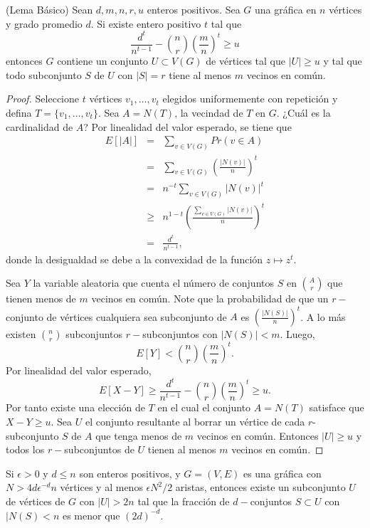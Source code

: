 \begin{theorem}(Lema Básico)\label{drc}
  Sean $d, m, n, r, u$ enteros positivos. Sea $G$ una gráfica en
  $n$ vértices y grado promedio $d$. Si existe
  entero positivo $t$
  tal que
  $$\frac{d^t}{n^{t-1}} - \binom{n}{r} \left(\frac{m}{n}\right)^t \geq u$$
  entonces $G$ contiene un conjunto $U \subset V(G)$ de vértices tal que
  $\vert U \vert \geq u$ y tal que todo subconjunto $S$ de $U$ con
  $\vert S \vert = r$
  tiene al menos $m$ vecinos en común.
\end{theorem}
\begin{proof}
  Seleccione $t$ vértices $v_1, \ldots, v_t$ elegidos uniformemente
  con repetición y defina $T = \{v_1, \ldots, v_t\}$. Sea $A = N(T)$,
  la vecindad de $T$ en $G$. ¿Cuál es la cardinalidad de $A$? Por
  linealidad del valor esperado, se tiene que
  \begin{eqnarray*}
    E[\vert A \vert] &=& \sum_{v \in V(G)} Pr(v \in A)\\
    &=& \sum_{v \in V(G)} \left(\frac{\vert N(v) \vert}{n} \right)^t\\
    &=& n^{-t} \sum_{v \in V(G)} \vert N(v) \vert^t \\
    &\ge& n^{1-t}\left( \frac{\sum_{v \in V(G)} \vert N(v) \vert}{n} \right)^t\\
    &=& \frac{d^t}{n^{t-1}},
  \end{eqnarray*}
  donde la desigualdad se debe a la convexidad de la función $z \mapsto z^t$.

  Sea $Y$ la variable aleatoria que cuenta
  el número de conjuntos $S$ en $\binom{A}{r}$ que tienen menos de
  $m$ vecinos en común. Note que la probabilidad de que un
  $r-$conjunto de vértices cualquiera sea subconjunto de $A$ es
  $\left( \frac{\vert N(S) \vert}{n}\right)^t$. A lo más existen
  $\binom{n}{r}$ subconjuntos $r-$subconjuntos con $\vert N(S)\vert < m$. Luego,
  $$ E[Y] < \binom{n}{r}\left(\frac{m}{n}\right)^t. $$
  Por linealidad del valor esperado,
  $$E[X - Y] \geq \frac{d^t}{n^{t-1}} - \binom{n}{r}\left(\frac{m}{n}
  \right)^t  \ge u.$$
  Por tanto existe una elección de $T$ en el cual el conjunto $A =
  N(T)$ satisface que $X - Y \ge u$.
  Sea $U$ el conjunto resultante al borrar un vértice de cada
  $r$-subconjunto $S$ de $A$ que tenga menos de $m$ vecinos en común.
  Entonces $\vert U \vert \ge u$ y todos los $r-$subconjuntos de $U$
  tienen al menos $m$ vecinos en común.
\end{proof}

\begin{theorem}
  Si $\epsilon > 0$ y $d\leq n$ son enteros positivos, y $G = (V, E)$
  es una gráfica con
  $N > 4d\epsilon^{-d}n$ vértices y al menos $\epsilon N^2 / 2$
  aristas, entonces existe un
  subconjunto $U$ de vértices de $G$ con $\vert U \vert > 2n$ tal que
  la fracción de $d-$conjuntos $S \subset U$ con $\vert N(S) < n$ es
  menor que $(2d)^{-d}$.
\end{theorem}

